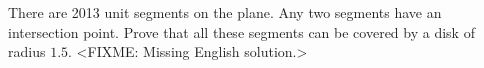 \problem
There are 2013 unit segments on the plane.
Any two segments have an intersection point.
Prove that all these segments can be covered by a disk of radius $1.5$.
\solution
<FIXME: Missing English solution.>
\endproblem
